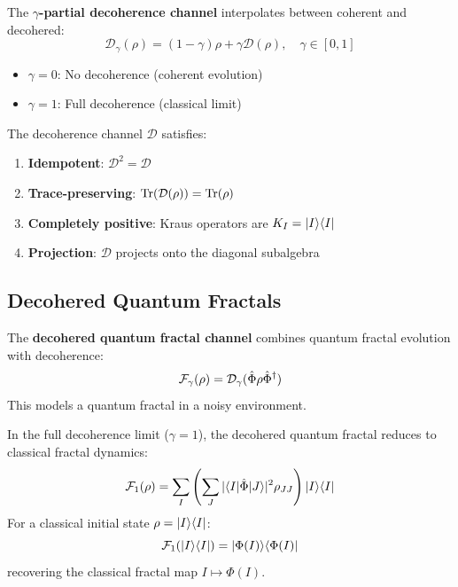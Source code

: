 \begin{definition}
\label{def:partial-decoherence}
The \textbf{$\gamma$-partial decoherence channel} interpolates between coherent and decohered:
\[
\mathcal{D}_\gamma(\rho) = (1 - \gamma)\rho + \gamma \mathcal{D}(\rho), \quad \gamma \in [0, 1]
\]
\begin{itemize}
  \item $\gamma = 0$: No decoherence (coherent evolution)
  \item $\gamma = 1$: Full decoherence (classical limit)
\end{itemize}
\end{definition}

\begin{proposition}
\label{prop:decoherence-props}
The decoherence channel $\mathcal{D}$ satisfies:
\begin{enumerate}
  \item \textbf{Idempotent}: $\mathcal{D}^2 = \mathcal{D}$
  \item \textbf{Trace-preserving}: $\mathrm{Tr}(\mathcal{D}(\rho)) = \mathrm{Tr}(\rho)$
  \item \textbf{Completely positive}: Kraus operators are $K_I = |I\rangle\langle I|$
  \item \textbf{Projection}: $\mathcal{D}$ projects onto the diagonal subalgebra
\end{enumerate}
\end{proposition}

\subsection{Decohered Quantum Fractals}

\begin{definition}
\label{def:decohered-qfractal}
The \textbf{decohered quantum fractal channel} combines quantum fractal evolution with decoherence:
\[
\mathcal{F}_\gamma(\rho) = \mathcal{D}_\gamma(\hat{\Phi} \rho \hat{\Phi}^\dagger)
\]
This models a quantum fractal in a noisy environment.
\end{definition}

\begin{theorem}
\label{thm:quantum-frac-classical-limit}
In the full decoherence limit ($\gamma = 1$), the decohered quantum fractal reduces to classical fractal dynamics:
\[
\mathcal{F}_1(\rho) = \sum_I \left(\sum_J |\langle I|\hat{\Phi}|J\rangle|^2 \rho_{JJ}\right) |I\rangle\langle I|
\]
For a classical initial state $\rho = |I\rangle\langle I|$:
\[
\mathcal{F}_1(|I\rangle\langle I|) = |\Phi(I)\rangle\langle \Phi(I)|
\]
recovering the classical fractal map $I \mapsto \Phi(I)$.
\end{theorem}

